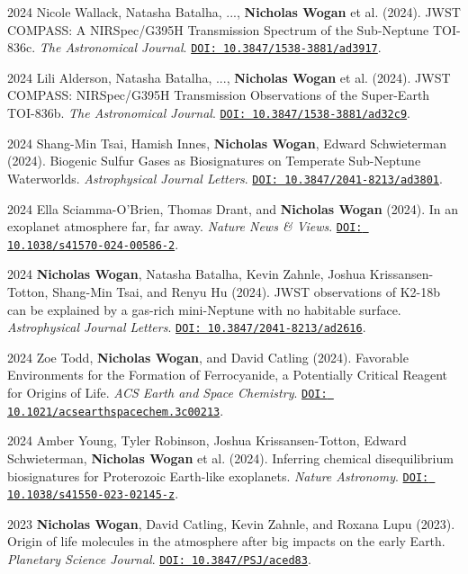 \documentclass{article}
\begin{document}
\begin{cvlist}
\item[2024]
  Nicole Wallack, Natasha Batalha, ..., \textbf{Nicholas Wogan} et al. (2024). JWST COMPASS: A NIRSpec/G395H Transmission Spectrum of the Sub-Neptune TOI-836c. \emph{The Astronomical Journal}. \href{https://doi.org/10.3847/1538-3881/ad3917}{\nolinkurl{DOI: 10.3847/1538-3881/ad3917}}.
\item[2024]
  Lili Alderson, Natasha Batalha, ..., \textbf{Nicholas Wogan} et al. (2024). JWST COMPASS: NIRSpec/G395H Transmission Observations of the Super-Earth TOI-836b. \emph{The Astronomical Journal}. \href{https://doi.org/10.3847/1538-3881/ad32c9}{\nolinkurl{DOI: 10.3847/1538-3881/ad32c9}}.
\item[2024]
  Shang-Min Tsai, Hamish Innes, \textbf{Nicholas Wogan}, Edward Schwieterman (2024). Biogenic Sulfur Gases as Biosignatures on Temperate Sub-Neptune Waterworlds. \emph{Astrophysical Journal Letters}. \href{https://doi.org/10.3847/2041-8213/ad3801}{\nolinkurl{DOI: 10.3847/2041-8213/ad3801}}.
\item[2024]
  Ella Sciamma-O'Brien, Thomas Drant, and \textbf{Nicholas Wogan} (2024). In an exoplanet atmosphere far, far away. \emph{Nature News \& Views}. \href{https://doi.org/10.1038/s41570-024-00586-2}{\nolinkurl{DOI: 10.1038/s41570-024-00586-2}}.
\item[2024]
  \textbf{Nicholas Wogan}, Natasha Batalha, Kevin Zahnle, Joshua Krissansen-Totton, Shang-Min Tsai, and Renyu Hu (2024). JWST observations of K2-18b can be explained by a gas-rich mini-Neptune with no habitable surface. \emph{Astrophysical Journal Letters}. \href{https://doi.org/10.3847/2041-8213/ad2616}{\nolinkurl{DOI: 10.3847/2041-8213/ad2616}}.
\item[2024]
  Zoe Todd, \textbf{Nicholas Wogan}, and David Catling (2024). Favorable Environments for the Formation of Ferrocyanide, a Potentially Critical Reagent for Origins of Life. \emph{ACS Earth and Space Chemistry}. \href{https://doi.org/10.1021/acsearthspacechem.3c00213}{\nolinkurl{DOI: 10.1021/acsearthspacechem.3c00213}}.
\item[2024]
  Amber Young, Tyler Robinson, Joshua Krissansen-Totton, Edward Schwieterman, \textbf{Nicholas Wogan} et al. (2024). Inferring chemical disequilibrium biosignatures for Proterozoic Earth-like exoplanets. \emph{Nature Astronomy}. \href{https://doi.org/10.1038/s41550-023-02145-z}{\nolinkurl{DOI: 10.1038/s41550-023-02145-z}}.
\item[2023]
  \textbf{Nicholas Wogan}, David Catling, Kevin Zahnle, and Roxana Lupu (2023). Origin of life molecules in the atmosphere after big impacts on the early Earth. \emph{Planetary Science Journal}. \href{https://doi.org/10.3847/PSJ/aced83}{\nolinkurl{DOI: 10.3847/PSJ/aced83}}.

\end{cvlist}
\end{document}
